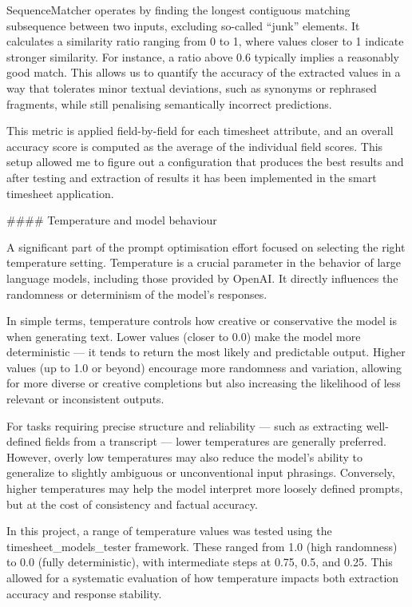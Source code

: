 \documentclass[
  digital,     %
  oneside,     %
  nosansbold,  %
  nocolorbold, %
  lof,         %
  lot,         %
]{fithesis4}
\begin{document}
\begin{markdown}
SequenceMatcher operates by finding the longest contiguous matching subsequence between two inputs, excluding so-called “junk” elements. It calculates a similarity ratio ranging from 0 to 1, where values closer to 1 indicate stronger similarity. For instance, a ratio above 0.6 typically implies a reasonably good match. This allows us to quantify the accuracy of the extracted values in a way that tolerates minor textual deviations, such as synonyms or rephrased fragments, while still penalising semantically incorrect predictions.

This metric is applied field-by-field for each timesheet attribute, and an overall accuracy score is computed as the average of the individual field scores. This setup allowed me to figure out a configuration that produces the best results and after testing and extraction of results it has been implemented in the smart timesheet application.

#### Temperature and model behaviour

A significant part of the prompt optimisation effort focused on selecting the right temperature setting. Temperature is a crucial parameter in the behavior of large language models, including those provided by OpenAI. It directly influences the randomness or determinism of the model's responses.

In simple terms, temperature controls how creative or conservative the model is when generating text. Lower values (closer to 0.0) make the model more deterministic — it tends to return the most likely and predictable output. Higher values (up to 1.0 or beyond) encourage more randomness and variation, allowing for more diverse or creative completions but also increasing the likelihood of less relevant or inconsistent outputs.

For tasks requiring precise structure and reliability — such as extracting well-defined fields from a transcript — lower temperatures are generally preferred. However, overly low temperatures may also reduce the model's ability to generalize to slightly ambiguous or unconventional input phrasings. Conversely, higher temperatures may help the model interpret more loosely defined prompts, but at the cost of consistency and factual accuracy.

In this project, a range of temperature values was tested using the timesheet_models_tester framework. These ranged from 1.0 (high randomness) to 0.0 (fully deterministic), with intermediate steps at 0.75, 0.5, and 0.25. This allowed for a systematic evaluation of how temperature impacts both extraction accuracy and response stability.

\end{markdown}
\shorthandon{-}
\end{document}
